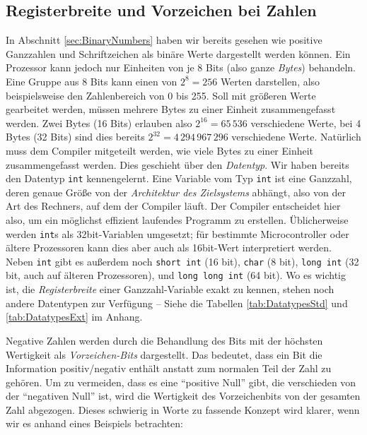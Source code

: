 \subsection{Registerbreite und Vorzeichen bei Zahlen}\label{sec:DataRepresentation}
\label{sec:Datawidth}
In Abschnitt \ref{sec:BinaryNumbers} haben wir bereits gesehen wie positive Ganzzahlen und Schriftzeichen als binäre Werte dargestellt werden können. Ein Prozessor kann jedoch nur Einheiten von je 8 Bits (also ganze \emph{Bytes}) behandeln. Eine Gruppe aus 8 Bits kann einen von $2^8 = 256$ Werten darstellen, also beispielsweise den Zahlenbereich von 0 bis 255. Soll mit größeren Werte gearbeitet werden, müssen mehrere Bytes zu einer Einheit zusammengefasst werden. Zwei Bytes (16 Bits) erlauben also $2^{16} = 65\,536$ verschiedene Werte, bei 4 Bytes (32 Bits) sind dies bereits $2^{32} = 4\,294\,967\,296$ verschiedene Werte. Natürlich muss dem Compiler mitgeteilt werden, wie viele Bytes zu einer Einheit zusammengefasst werden. Dies geschieht über den \emph{Datentyp}. Wir haben bereits den Datentyp \texttt{int} kennengelernt. Eine Variable vom Typ \texttt{int} ist eine Ganzzahl, deren genaue Größe von der \emph{Architektur des Zielsystems} abhängt, also von der Art des Rechners, auf dem der Compiler läuft. Der Compiler entscheidet hier also, um ein möglichst effizient laufendes Programm zu erstellen. Üblicherweise werden \texttt{int}s als 32bit-Variablen umgesetzt; für bestimmte Microcontroller oder ältere Prozessoren kann dies aber auch als 16bit-Wert interpretiert werden. Neben \texttt{int} gibt es außerdem noch \texttt{short int} (16 bit), \texttt{char} (8 bit), \texttt{long int} (32 bit, auch auf älteren Prozessoren), und \texttt{long long int} (64 bit). Wo es wichtig ist, die \emph{Registerbreite} einer Ganzzahl-Variable exakt zu kennen, stehen noch andere Datentypen zur Verfügung -- Siehe die Tabellen \ref{tab:DatatypesStd} und \ref{tab:DatatypesExt} im Anhang.

Negative Zahlen werden durch die Behandlung des Bits mit der höchsten Wertigkeit als \emph{Vorzeichen-Bits} dargestellt. Das bedeutet, dass ein Bit die Information positiv/negativ enthält anstatt zum normalen Teil der Zahl zu gehören. Um zu vermeiden, dass es eine \enquote{positive Null} gibt, die verschieden von der \enquote{negativen Null} ist, wird die Wertigkeit des Vorzeichenbits von der gesamten Zahl abgezogen. Dieses schwierig in Worte zu fassende Konzept wird klarer, wenn wir es anhand eines Beispiels betrachten:

